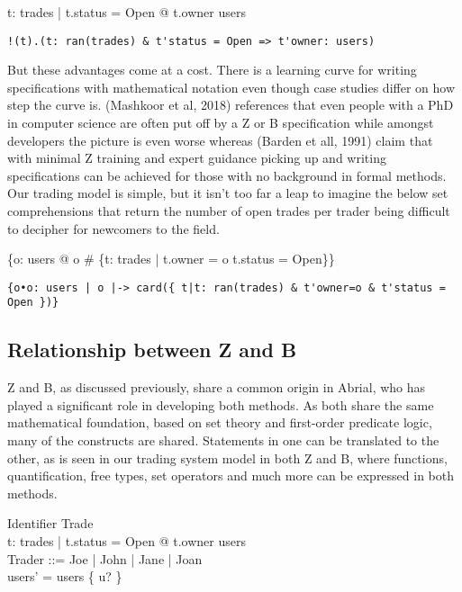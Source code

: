 \documentclass{article}
\begin{document}
\begin{zed}
\forall t: \ran trades | t.status = Open @ t.owner \in users \\ 
\end{zed}

\begin{verbatim}
!(t).(t: ran(trades) & t'status = Open => t'owner: users)
\end{verbatim}

\pagebreak

\hspace{-0.68cm} But these advantages come at a cost. There is a learning curve for writing specifications with mathematical notation even though case studies differ on how step the curve is. (Mashkoor et al, 2018) references that even people with a PhD in computer science are often put off by a Z or B specification while amongst developers the picture is even worse whereas (Barden et all, 1991) claim that with minimal Z training and expert guidance picking up and writing specifications can be achieved for those with no background in formal methods. \\

\hspace{-0.68cm} Our trading model is simple, but it isn’t too far a leap to imagine the below set comprehensions that return the number of open trades per trader being difficult to decipher for newcomers to the field. 

\begin{zed}
\{o: users @ o \mapsto \# \{t: \ran trades | t.owner = o \land t.status = Open\}\}
\end{zed}

\begin{verbatim}
{o•o: users | o |-> card({ t|t: ran(trades) & t'owner=o & t'status = Open })}
\end{verbatim}

\pagebreak
\subsection*{Relationship between Z and B}

Z and B, as discussed previously, share a common origin in Abrial, who has played a significant role in developing both methods. As both share the same mathematical foundation, based on set theory and first-order predicate logic, many of the constructs are shared. Statements in one can be translated to the other, as is seen in our trading system model in both Z and B, where functions, quantification, free types, set operators and much more can be expressed in both methods. 
\begin{zed}
Identifier \pfun Trade \\
\forall t: \ran trades | t.status = Open @ t.owner \in users \\
Trader ::= Joe | John | Jane | Joan  \\
users' = users \setminus \{ u? \} \\
\end{zed}
\end{document}
